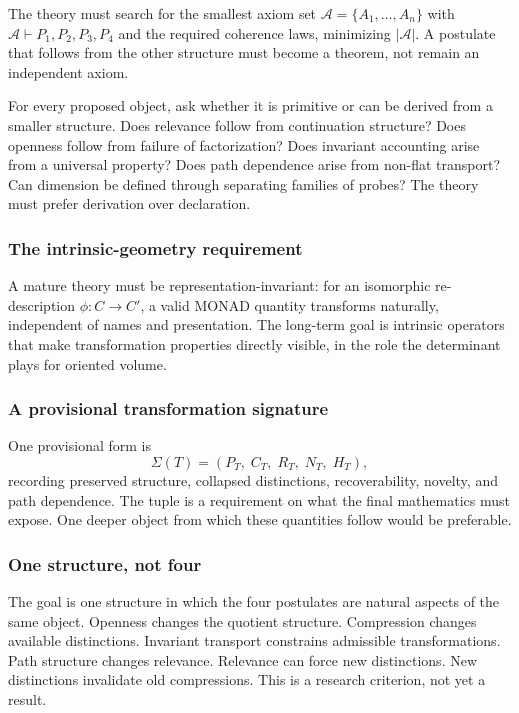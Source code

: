 The theory must search for the smallest axiom set
$\mathcal{A} = \{A_1, \ldots, A_n\}$ with
$\mathcal{A} \vdash P_1, P_2, P_3, P_4$ and the required coherence
laws, minimizing $|\mathcal{A}|$. A postulate that follows from the
other structure must become a theorem, not remain an independent
axiom.

For every proposed object, ask whether it is primitive or can be
derived from a smaller structure. Does relevance follow from
continuation structure? Does openness follow from failure of
factorization? Does invariant accounting arise from a universal
property? Does path dependence arise from non-flat transport? Can
dimension be defined through separating families of probes? The theory
must prefer derivation over declaration.

\subsubsection{The intrinsic-geometry requirement}

A mature theory must be representation-invariant: for an isomorphic
re-description $\phi : C \to C'$, a valid MONAD quantity transforms
naturally, independent of names and presentation. The long-term goal
is intrinsic operators that make transformation properties directly
visible, in the role the determinant plays for oriented volume.

\subsubsection{A provisional transformation signature}\label{ss:signature}

One provisional form is
\begin{equation}
  \Sigma(T) = (P_T,\; C_T,\; R_T,\; N_T,\; H_T),\label{eq:signature}
\end{equation}
recording preserved structure, collapsed distinctions,
recoverability, novelty, and path dependence. The tuple is a
requirement on what the final mathematics must expose. One deeper
object from which these quantities follow would be preferable.

\subsubsection{One structure, not four}

The goal is one structure in which the four postulates are natural
aspects of the same object. Openness changes the quotient structure.
Compression changes available distinctions. Invariant transport
constrains admissible transformations. Path structure changes
relevance. Relevance can force new distinctions. New distinctions
invalidate old compressions. This is a research criterion, not yet a
result.

